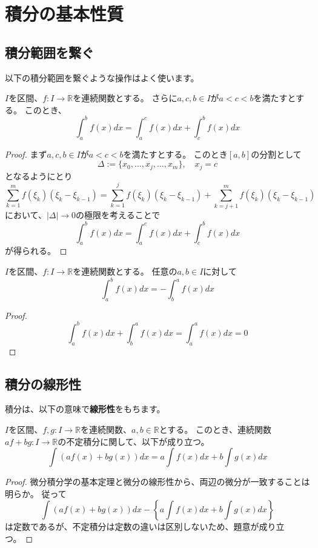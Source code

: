 
\chapter{積分の基本性質}

\section{積分範囲を繋ぐ}

以下の積分範囲を繋ぐような操作はよく使います。
\begin{theorem}
  $I$を区間、$f:I\to\mathbb{R}$を連続関数とする。
  さらに$a,c,b\in I$が$a<c<b$を満たすとする。
  このとき、
  \[
    \int_a^bf(x)dx=\int_a^c f(x)dx + \int_c^bf(x)dx
  \]
\end{theorem}
\begin{proof}
  まず$a,c,b\in I$が$a<c<b$を満たすとする。
  このとき$[a,b]$の分割として
  \[
    \Delta:=\{x_0,\dots,x_j,\dots,x_m\},\quad x_j=c
  \]
  となるようにとり
  \[
    \sum_{k=1}^mf(\xi_k)(\xi_k-\xi_{k-1})=\sum_{k=1}^jf(\xi_k)(\xi_k-\xi_{k-1})+\sum_{k=j+1}^mf(\xi_k)(\xi_k-\xi_{k-1})
  \]
  において、$|\Delta|\to0$の極限を考えることで
  \[
    \int_a^bf(x)dx=\int_a^c f(x)dx + \int_c^bf(x)dx
  \]
  が得られる。
\end{proof}
\begin{corollary}
  $I$を区間、$f:I\to\mathbb{R}$を連続関数とする。
  任意の$a,b\in I$に対して
  \[
    \int_a^bf(x)dx=-\int_b^af(x)dx
  \]
\end{corollary}
\begin{proof}
  \[
    \int_a^bf(x)dx+\int_b^af(x)dx=\int_a^af(x)dx=0
  \]
\end{proof}

\section{積分の線形性}

積分は、以下の意味で\textbf{線形性}をもちます。
\begin{theorem}
  $I$を区間、$f,g:I\to\mathbb{R}$を連続関数、$a,b\in\mathbb{R}$とする。
  このとき、連続関数$af+bg:I\to\mathbb{R}$の不定積分に関して、以下が成り立つ。
  \[
    \int(af(x)+bg(x))dx=a\int f(x)dx+b\int g(x)dx
  \]
\end{theorem}
\begin{proof}
  微分積分学の基本定理と微分の線形性から、両辺の微分が一致することは明らか。
  従って
  \[
    \int(af(x)+bg(x))dx-\left\{a\int f(x)dx+b\int g(x)dx\right\}
  \]
  は定数であるが、不定積分は定数の違いは区別しないため、題意が成り立つ。
\end{proof}

